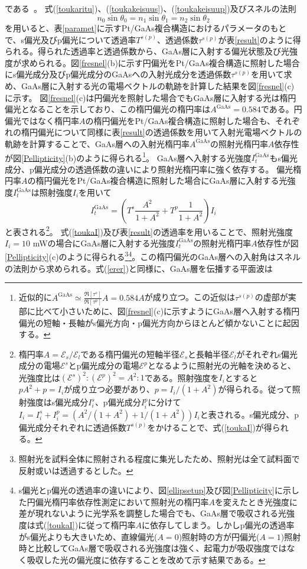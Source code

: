 である~\cite{Macleod}。
式(\ref{toukaritu})、(\ref{toukakeisuus})、(\ref{toukakeisuup})及びスネルの法則
\begin{equation}
n_0\sin\theta_0=n_1\sin\theta_1=n_2\sin\theta_2
\end{equation}
を用いると、表\ref{paramet}に示すPt/GaAs複合構造におけるパラメータのもとで、s偏光及びp偏光について透過率$T^{s(p)}$、透過係数$\tau^{s(p)}$が表\ref{result}のように得られる。得られた透過率と透過係数から、GaAs層に入射する偏光状態及び光強度が求められる。図\ref{fresnel}(b)に示す円偏光をPt/GaAs複合構造に照射した場合にs偏光成分及びp偏光成分のGaAsへの入射光成分を透過係数$\tau^{s(p)}$を用いて求め、GaAs層に入射する光の電場ベクトルの軌跡を計算した結果を図\ref{fresnel}(c)に示す。
図\ref{fresnel}(c)は円偏光を照射した場合でもGaAs層に入射する光は楕円偏光となることを示しており、この楕円偏光の楕円率は$A^\text{GaAs}=0.584$である。円偏光ではなく楕円率$A$の楕円偏光をPt/GaAs複合構造に照射した場合も、それぞれの楕円偏光について同様に表\ref{result}の透過係数を用いて入射光電場ベクトルの軌跡を計算することで、GaAs層への入射光楕円率$A^\text{GaAs}$の照射光楕円率$A$依存性が図\ref{Pellipticity}(b)のように得られる\footnote{近似的に$\displaystyle A^\text{GaAs}\simeq \frac{\Re[\tau^s]}{\Re[\tau^p]}A=0.584A$が成り立つ。この近似は$\tau^{s(p)}$の虚部が実部に比べて小さいために、図\ref{fresnel}(c)に示すようにGaAs層へ入射する楕円偏光の短軸・長軸がs偏光方向・p偏光方向からほとんど傾かないことに起因する。\label{foo}}。
GaAs層へ入射する光強度$I_t^\text{GaAs}$もs偏光成分、p偏光成分の透過係数の違いにより照射光楕円率に強く依存する。
偏光楕円率$A$の楕円偏光をPt/GaAs複合構造に照射した場合にGaAs層に入射する光強度$I_t^\text{GaAs}$は照射強度$I_i$を用いて
\begin{equation}
I_t^\text{GaAs}=\left( T^s\frac{A^2}{1+A^2}+T^p\frac{1}{1+A^2}\right) I_i\label{toukaI}
\end{equation}
と表される\footnote{楕円率$A= \mathscr{E}_s/\mathscr{E}_l$である楕円偏光の短軸半径$\mathscr{E}_s$と長軸半径$\mathscr{E}_l$がそれぞれs偏光成分の電場$\mathscr{E}^s$とp偏光成分の電場$\mathscr{E}^p$となるように照射光の光軸を決めると、光強度比は$({\mathscr{E}^{s}})^ 2:({\mathscr{E}^p})^2=A^2:1$である。照射強度を$I_i$とすると$pA^2+p=I_i$が成り立つ必要があり、$p=I_i/(1+A^2)$が得られる。従って照射強度はs偏光成分$I_i^s$、p偏光成分$I_i^p$に分けて$I_i=I_i^s+I_i^p=\left(A^2/(1+A^2)+1/(1+A^2)\right)I_i$と表される。s偏光成分、p偏光成分それぞれに透過係数$T^{s(p)}$をかけることで、式(\ref{toukaI})が得られる。}。
式(\ref{toukaI})及び表\ref{result}の透過率を用いることで、照射光強度$I_i=10$ mWの場合にGaAs層に入射する光強度$I_t^\text{GaAs}$の照射光楕円率$A$依存性が図\ref{Pellipticity}(c)のように得られる\footnote{照射光を試料全体に照射される程度に集光したため、照射光は全て試料面で反射或いは透過するとした。}\footnote{
s偏光とp偏光の透過率の違いにより、図\ref{ellipsetup}及び図\ref{Pellipticity}に示した円偏光楕円率依存性測定において照射光の楕円率$A$を変えたとき光強度に差が現れないように光学系を調整した場合でも、GaAs層で吸収される光強度は式(\ref{toukaI})に従って楕円率$A$に依存してしまう。しかしp偏光の透過率がs偏光よりも大きいため、直線偏光($A=0$)照射時の方が円偏光($A=1$)照射時と比較してGaAs層で吸収される光強度は強く、起電力が吸収強度ではなく吸収した光の偏光度に依存することを改めて示す結果である。}。この楕円偏光のGaAs層への入射角はスネルの法則から求められる。式(\ref{erer})と同様に、GaAs層を伝播する平面波は

